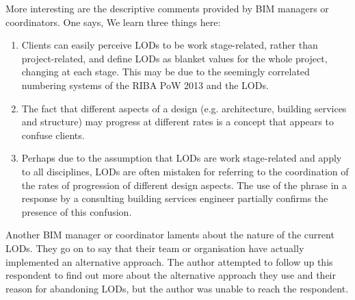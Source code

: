 More interesting are the descriptive comments provided by BIM managers or coordinators.
One says, 
We learn three things here:
\begin{enumerate}
    \item Clients can easily perceive LODs to be work stage-related, rather than project-related, and define LODs as blanket values for the whole project, changing at each stage.
    This may be due to the seemingly correlated numbering systems of the RIBA PoW 2013 and the LODs. %
    
    \item The fact that different aspects of a design (e.g. architecture, building services and structure) may progress at different rates is a concept that appears to confuse clients.
    
    \item Perhaps due to the assumption that LODs are work stage-related and apply to all disciplines, LODs are often mistaken for referring to the coordination of the rates of progression of different design aspects.
    The use of the phrase  in a response by a consulting building services engineer partially confirms the presence of this confusion.
\end{enumerate}

Another BIM manager or coordinator laments about the  nature of the current LODs.
They go on to say that their team or organisation have actually implemented an alternative approach.
The author attempted to follow up this respondent to find out more about the alternative approach they use and their reason for abandoning LODs, but the author was unable to reach the respondent.



